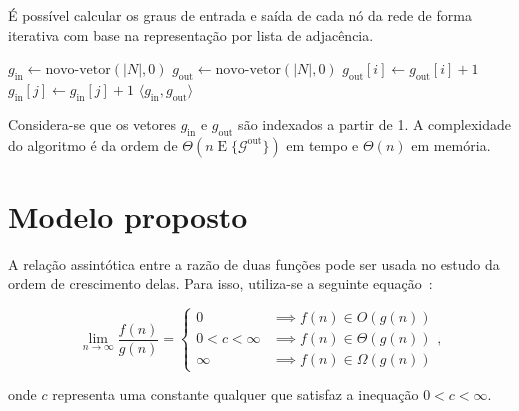\documentclass[11pt,a4paper]{article}
\begin{document}
\begin{algoritmo}
\label{alg:graus}
%
É possível calcular os graus de entrada e saída de cada nó da rede
de forma iterativa com base na representação por lista de adjacência.

\begin{algorithmic}[1]
\STATE{}
\STATE $g_\text{in} \leftarrow \text{novo-vetor}(|N|, 0)$
\STATE $g_\text{out} \leftarrow \text{novo-vetor}(|N|, 0)$
        \STATE{}
        \STATE $g_\text{out}[i] \leftarrow g_\text{out}[i] + 1$
        \STATE $g_\text{in}[j] \leftarrow g_\text{in}[j] + 1$
    \ENDFOR
\ENDFOR
\RETURN $\langle g_\text{in}, g_\text{out} \rangle$
\end{algorithmic}
Considera-se que os vetores $g_\text{in}$ e $g_\text{out}$ são indexados a
partir de 1.
A complexidade do algoritmo é da ordem de 
$\Theta(n\operatorname{E}\{\mathcal{G}^\text{out}\})$ em tempo e $\Theta(n)$
em memória.
\end{algoritmo}

\section{Modelo proposto}
\label{sec:3:modelo}

A relação assintótica entre a razão de duas funções pode ser usada no estudo
da ordem de crescimento delas.
Para isso, utiliza-se a seguinte
equação~\cite{brassard1996fundamentals,cormen2009algorithms}:
\begin{linenomath}
\begin{equation}\label{eq:asymtheorem}
\lim_{n\rightarrow\infty}\frac{f(n)}{g(n)}=
    \left\{
    \begin{array}{cl}
    0               & \implies f(n) \in O(g(n)) \\
    0 < c < \infty  & \implies f(n) \in \Theta(g(n)) \\
    \infty          & \implies f(n) \in \Omega(g(n)) 
    \end{array}
    \right.\text{,}
\end{equation}
\end{linenomath}
onde $c$ representa uma constante qualquer que satisfaz a inequação
$0<c<\infty$.
\end{document}

